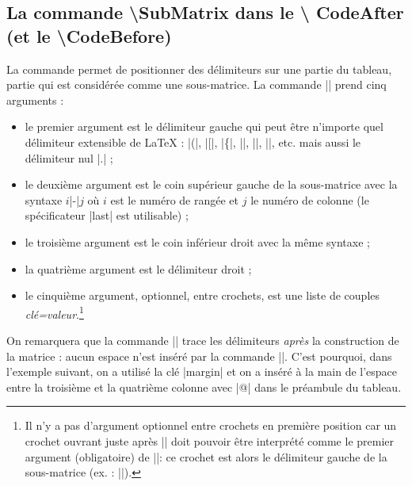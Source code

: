 \documentclass[dvipsnames]{article}%
\begin{document}
\subsection{La commande \textbackslash SubMatrix dans le \textbackslash
  CodeAfter (et le \textbackslash CodeBefore)}

\label{sub-matrix}

La commande  permet de positionner des délimiteurs
sur une partie du tableau, partie qui est considérée comme une sous-matrice. La
commande |\SubMatrix| prend cinq arguments :
\begin{itemize}
\item le premier argument est le délimiteur gauche qui peut être n'importe
quel délimiteur extensible de LaTeX : |(|, |[|, |\{|, |\langle|, |\lgroup|,
|\lfloor|, etc. mais aussi le délimiteur nul |.| ;
\item le deuxième argument est le coin supérieur gauche de la sous-matrice avec
la syntaxe $i$|-|$j$ où $i$ est le numéro de rangée et $j$ le numéro de colonne
(le spécificateur |last| est utilisable) ;
\item le troisième argument est le coin inférieur droit avec la même syntaxe ;
\item la quatrième argument est le délimiteur droit ;
\item le cinquième argument, optionnel, entre crochets, est une liste de couples
\textsl{clé=valeur}.\footnote{Il n'y a pas d'argument optionnel entre crochets en première
position car un crochet ouvrant juste après |\SubMatrix| doit pouvoir être
interprété comme le premier argument (obligatoire) de |\SubMatrix|: ce
crochet est alors le délimiteur gauche de la sous-matrice (ex. :
|\SubMatrix[{2-2}{4-7}]|).}
\end{itemize}

On remarquera que la commande |\SubMatrix| trace les délimiteurs \emph{après} la
construction de la matrice : aucun espace n'est inséré par la commande
|\SubMatrix|. C'est pourquoi, dans l'exemple suivant, on a utilisé la clé
|margin| et on a inséré à la main de l'espace entre la troisième et la quatrième
colonne avec |@{\hspace{1.5em}}| dans le préambule du tableau.
\end{document}
